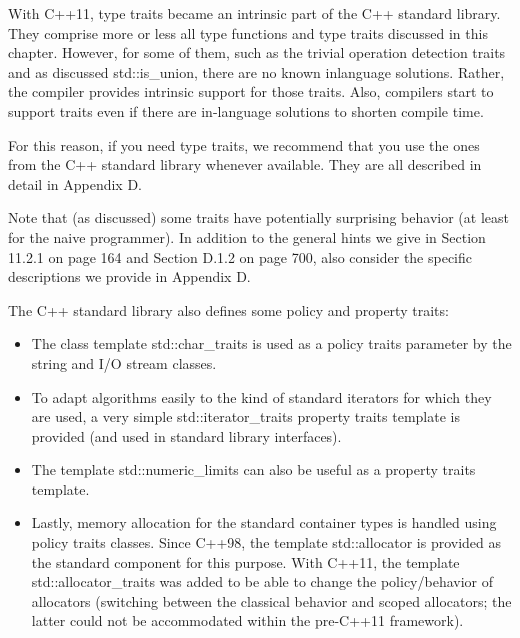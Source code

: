 With C++11, type traits became an intrinsic part of the C++ standard library. They comprise more or less all type functions and type traits discussed in this chapter. However, for some of them, such as the trivial operation detection traits and as discussed std::is\_union, there are no known inlanguage solutions. Rather, the compiler provides intrinsic support for those traits. Also, compilers start to support traits even if there are in-language solutions to shorten compile time. 

For this reason, if you need type traits, we recommend that you use the ones from the C++ standard library whenever available. They are all described in detail in Appendix D.

Note that (as discussed) some traits have potentially surprising behavior (at least for the naive programmer). In addition to the general hints we give in Section 11.2.1 on page 164 and Section D.1.2 on page 700, also consider the specific descriptions we provide in Appendix D.

The C++ standard library also defines some policy and property traits:

\begin{itemize}
\item 
The class template std::char\_traits is used as a policy traits parameter by the string and I/O stream classes.

\item 
To adapt algorithms easily to the kind of standard iterators for which they are used, a very simple std::iterator\_traits property traits template is provided (and used in standard library
interfaces).

\item 
The template std::numeric\_limits can also be useful as a property traits template.

\item 
Lastly, memory allocation for the standard container types is handled using policy traits classes. Since C++98, the template std::allocator is provided as the standard component for this purpose. With C++11, the template std::allocator\_traits was added to be able to change the policy/behavior of allocators (switching between the classical behavior and scoped allocators; the latter could not be accommodated within the pre-C++11 framework).
\end{itemize}



































